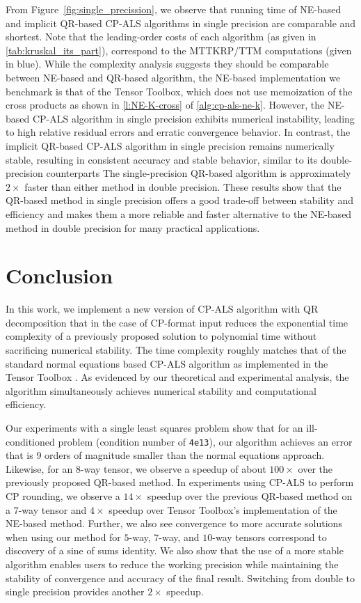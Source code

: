 \documentclass{article}
\begin{document}
{From Figure~\ref{fig:single_precission}, we observe that running time of NE-based and implicit QR-based CP-ALS algorithms in single precision are comparable and shortest. 
Note that the leading-order costs of each algorithm (as given in \cref{tab:kruskal_its_part}), correspond to the MTTKRP/TTM computations (given in blue).
While the complexity analysis suggests they should be comparable between NE-based and QR-based algorithm, the NE-based implementation we benchmark is that of the Tensor Toolbox, which does not use memoization of the cross products as shown in \cref{l:NE-K-cross} of \cref{alg:cp-als-ne-k}.
However, the NE-based CP-ALS algorithm in single precision exhibits numerical instability, leading to high relative residual errors and erratic convergence behavior. 
In contrast, the implicit QR-based CP-ALS algorithm in single precision remains numerically stable, resulting in consistent accuracy and stable behavior, similar to its double-precision counterparts
The single-precision QR-based algorithm is approximately $2 \times$ faster than either method in double precision. 
These results show that the QR-based method in single precision offers a good trade-off between stability and efficiency and makes them a more reliable and faster alternative to the NE-based method in double precision for many practical applications.

}

\section{Conclusion}
\label{sec:conclusion}

In this work, we implement a new version of CP-ALS algorithm with QR decomposition that in the case of CP-format input reduces the exponential time complexity of a previously proposed solution \cite{MVLB23} to polynomial time without sacrificing numerical stability.
The time complexity roughly matches that of the standard normal equations based CP-ALS algorithm as implemented in the Tensor Toolbox \cite{TensorToolbox}.
As evidenced by our theoretical and experimental analysis, the algorithm simultaneously achieves numerical stability and computational efficiency.

Our experiments with a single least squares problem show that for an ill-conditioned problem (condition number of \texttt{4e13}), our algorithm achieves an error that is 9 orders of magnitude smaller than the normal equations approach.
Likewise, for an 8-way tensor, we observe a speedup of about $100\times$ over the previously proposed QR-based method.
In experiments using CP-ALS to perform CP rounding, we observe a $14\times$ speedup over the previous QR-based method on a 7-way tensor and $4\times$ speedup over Tensor Toolbox's implementation of the NE-based method.
Further, we also see convergence to more accurate solutions when using our method for $5$-way, $7$-way, and $10$-way tensors correspond to discovery of a sine of sums identity.
We also show that the use of a more stable algorithm enables users to reduce the working precision while maintaining the stability of convergence and accuracy of the final result.
Switching from double to single precision provides another $2\times$ speedup.
\end{document}
